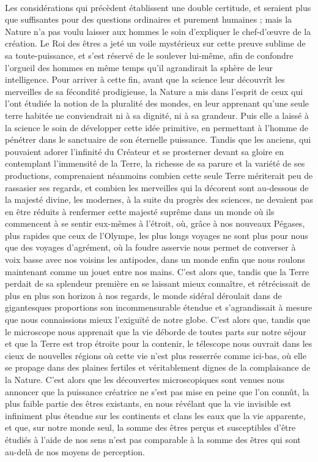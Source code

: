 \documentclass[a4paper, 11pt, oneside, landscape]{article}
\begin{document}
\paragraph{}
Les considérations qui précèdent établissent une double certitude, et seraient plus que suffisantes pour des questions ordinaires et purement humaines ; mais la Nature n'a pas voulu laisser aux hommes le soin d'expliquer le chef-d'œuvre de la création. Le Roi des êtres a jeté un voile mystérieux sur cette preuve sublime de sa toute-puissance, et s'est réservé de le soulever lui-même, afin de confondre l'orgueil des hommes en même temps qu'il agrandirait la sphère de leur intelligence. Pour arriver à cette fin, avant que la science leur découvrît les merveilles de sa fécondité prodigieuse, la Nature a mis dans l'esprit de ceux qui l'ont étudiée la notion de la pluralité des mondes, en leur apprenant qu'une seule terre habitée ne conviendrait ni à sa dignité, ni à sa grandeur. Puis elle a laissé à la science le soin de développer cette idée primitive, en permettant à l'homme de pénétrer dans le sanctuaire de son éternelle puissance. Tandis que les anciens, qui pouvaient adorer l'infinité du Créateur et se prosterner devant sa gloire en contemplant l'immensité de la Terre, la richesse de sa parure et la variété de ses productions, comprenaient néanmoins combien cette seule Terre mériterait peu de rassasier ses regards, et combien les merveilles qui la décorent sont au-dessous de la majesté divine, les modernes, à la suite du progrès des sciences, ne devaient pas en être réduits à renfermer cette majesté suprême dans un monde où ils commencent à se sentir eux-mêmes à l'étroit, où, grâce à nos nouveaux Pégases, plus rapides que ceux de l'Olympe, les plus longs voyages ne sont plus pour nous que des voyages d'agrément, où la foudre asservie nous permet de converser à voix basse avec nos voisins les antipodes, dans un monde enfin que nous roulons maintenant comme un jouet entre nos mains. C'est alors que, tandis que la Terre perdait de sa splendeur première en se laissant mieux connaître, et rétrécissait de plus en plus son horizon à nos regards, le monde sidéral déroulait dans de gigantesques proportions son incommensurable étendue et s'agrandissait à mesure que nous connaissions mieux l'exiguïté de notre globe. C'est alors que, tandis que le microscope nous apprenait que la vie déborde de toutes parts sur notre séjour et que la Terre est trop étroite pour la contenir, le télescope nous ouvrait dans les cieux de nouvelles régions où cette vie n'est plus resserrée comme ici-bas, où elle se propage dans des plaines fertiles et véritablement dignes de la complaisance de la Nature. C'est alors que les découvertes microscopiques sont venues nous annoncer que la puissance créatrice ne s'est pas mise en peine que l'on connût, la plus faible partie des êtres existants, en nous révélant que la vie invisible est infiniment plus étendue sur les continents et clans les eaux que la vie apparente, et que, sur notre monde seul, la somme des êtres perçus et susceptibles d'être étudiés à l'aide de nos sens n'est pas comparable à la somme des êtres qui sont au-delà de nos moyens de perception.
\end{document}
